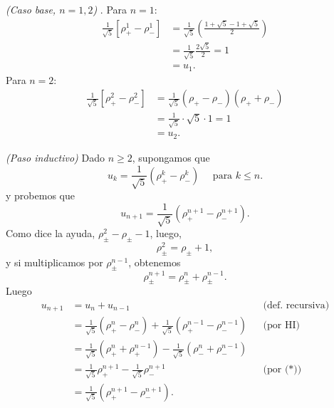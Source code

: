 \documentclass[a4paper,12pt,twoside,spanish,reqno]{amsbook}
\numberwithin{equation}{section}
\begin{document}
\begin{enumerate}
        \textit{(Caso  base, $n=1,2$) }. Para $n=1$:
        \begin{align*}
            \frac{1}{\sqrt{5}}\left[\rho_+^1-\rho_-^1\right]    &=  \frac{1}{\sqrt{5}}\left(\frac{1+\sqrt{5}- 1+\sqrt{5}}{2}\right) \\
            &=  \frac{1}{\sqrt{5}}\frac{2\sqrt{5}}{2} = 1 \\
            &= u_1. 
        \end{align*}
        Para $n=2$: 
        \begin{align*}
            \frac{1}{\sqrt{5}}\left[\rho_+^2-\rho_-^2\right]  &=  \frac{1}{\sqrt{5}}(\rho_+-\rho_-)(\rho_++\rho_-) \\
            &= \frac{1}{\sqrt{5}}\cdot \sqrt{5} \cdot 1 = 1\\
            &= u_2. 
        \end{align*}
        
        \textit{(Paso  inductivo)} Dado $n \ge 2$, supongamos que 
        \begin{equation}
            u_{k}= \frac{1}{\sqrt{5}}(\rho_+^{k} - \rho_-^{k})\quad \text{ para }k \le n. \tag{HI}
        \end{equation}
        y probemos que 
        \begin{equation*}
            u_{n+1}= \frac{1}{\sqrt{5}}(\rho_+^{n+1} - \rho_-^{n+1}).
        \end{equation*}
        Como dice la ayuda, $\rho_\pm^2 - \rho_\pm - 1$, luego, 
        $$
        \rho_\pm^2 = \rho_\pm + 1,
        $$ 
        y  si multiplicamos por  $ \rho_\pm^{n-1}$, obtenemos
        \begin{equation*}
            \rho_\pm^{n+1} = \rho_\pm^{n} + \rho_\pm^{n-1}. \tag{*}
        \end{equation*}
        Luego 
        \begin{align*}
            u_{n+1}&=  u_n + u_{n-1}&&\text{(def. recursiva)}\\
            &= \frac{1}{\sqrt{5}}(\rho_+^{n} - \rho_-^{n}) + \frac{1}{\sqrt{5}}(\rho_+^{n-1} - \rho_-^{n-1})&&\text{(por HI)}\\
            &= \frac{1}{\sqrt{5}}(\rho_+^{n} + \rho_+^{n-1}) - \frac{1}{\sqrt{5}}(\rho_-^{n} +\rho_-^{n-1})&&\\
            &= \frac{1}{\sqrt{5}}\rho_+^{n+1} - \frac{1}{\sqrt{5}}\rho_-^{n+1}&&\text{(por (*))}\\
            &=\frac{1}{\sqrt{5}}(\rho_+^{n+1} - \rho_-^{n+1}).&&
        \end{align*}
    \end{enumerate}
    
    
\end{document}
